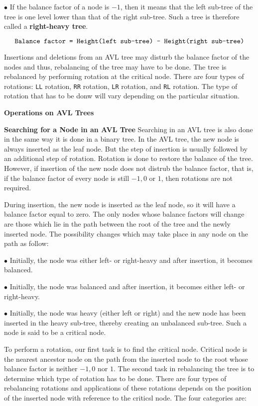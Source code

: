 \vskip 3mm
$\bullet$ If the balance factor of a node is $-1$, then it means that the left sub-tree of the tree is one level lower than that of the right sub-tree. Such a tree is therefore called a {\bf right-heavy tree}.

$$\hbox{\tt Balance factor = Height(left sub-tree) - Height(right sub-tree)}$$

Insertions and deletions from an AVL tree may  disturb the balance factor of the nodes and thus, rebalancing of the tree may have to be done. The tree is rebalanced by performing rotation at the critical node. There are four types of rotations: {\tt LL} rotation, {\tt RR} rotation, {\tt LR} rotation, and {\tt RL} rotation. The type of rotation that has to be donw will vary depending on the particular situation.

\filbreak
\vskip 1cm
{\bf Operations on AVL Trees}

\vskip 3mm
{\bf Searching for a Node in an AVL Tree}
\vskip 1mm
Searching in an AVL tree is also done in the same way it is done in a binary tree. In the AVL tree, the new node is always inserted as the leaf node. But the step of insertion is usually followed by an additional step of rotation. Rotation is done to restore the balance of the tree. However, if insertion of the new node does not distrub the balance factor, that is, if the balance factor of every node is still $-1,0$ or $1$, then rotations are not required.

\vskip 1mm
During insertion, the new node is inserted as the leaf node, so it will have a balance factor equal to zero. The only nodes whose balance factors will change are those which lie in the path between the root of the tree and the newly inserted node. The possibility changes which may take place in any node on the path as follow:

\vskip 1mm
\qquad$\bullet$ Initially, the node was either left- or right-heavy and after insertion, it becomes balanced.

\vskip 3mm
\qquad$\bullet$ Initially, the node was balanced and after insertion, it becomes either left- or right-heavy.

\vskip 3mm
\qquad$\bullet$ Initially, the node was heavy (either left or right) and the new node has been inserted in the heavy sub-tree, thereby creating an unbalanced sub-tree. Such a node is said to be a critical node.

\vskip 3mm
To perform a rotation, our first task is to find the critical node. Critical node is the nearest ancestor node on the path from the inserted node to the root whose balance factor is neither $-1,0$ nor $1$. The second task in rebalancing the tree is to determine which type of rotation has to be done. There are four types of rebalancing rotations and applications of these rotations depends on the position of the inserted node with reference to the criticsl node. The four categories are:

